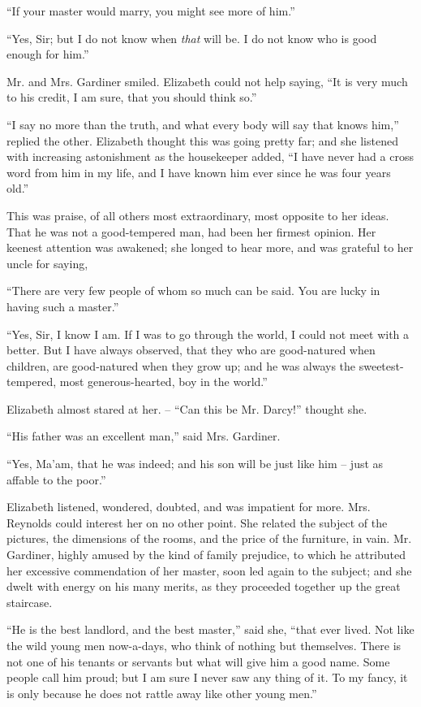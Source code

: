 “If your master would marry, you might see more of
him.”

“Yes, Sir; but I do not know when \textit{that} will be. I do
not know who is good enough for him.”

Mr. and Mrs. Gardiner smiled. Elizabeth could not
help saying, “It is very much to his credit, I am sure, that
you should think so.”

“I say no more than the truth, and what every body
will say that knows him,” replied the other. Elizabeth
thought this was going pretty far; and she listened with
increasing astonishment as the housekeeper added,
“I have never had a cross word from him in my
life, and I have known him ever since he was four years
old.”

This was praise, of all others most extraordinary, most
opposite to her ideas. That he was not a good-tempered
man, had been her firmest opinion. Her keenest attention
was awakened; she longed to hear more, and was grateful
to her uncle for saying,

“There are very few people of whom so much can be
said. You are lucky in having such a master.”

“Yes, Sir, I know I am. If I was to go through the
world, I could not meet with a better. But I have always
observed, that they who are good-natured when children,
are good-natured when they grow up; and he was always
the sweetest-tempered, most generous-hearted, boy in the
world.”

Elizabeth almost stared at her. -- “Can this be Mr.
Darcy!” thought she.

“His father was an excellent man,” said Mrs. Gardiner.

“Yes, Ma’am, that he was indeed; and his son will be
just like him -- just as affable to the poor.”

Elizabeth listened, wondered, doubted, and was impatient
for more. Mrs. Reynolds could interest her on no
other point. She related the subject of the pictures, the
dimensions of the rooms, and the price of the furniture,
in vain. Mr. Gardiner, highly amused by the kind of
family prejudice, to which he attributed her excessive
commendation of her master, soon led again to the subject;
and she dwelt with energy on his many merits, as they
proceeded together up the great staircase.

“He is the best landlord, and the best master,” said
she, “that ever lived. Not like the wild young men
now-a-days, who think of nothing but themselves. There
is not one of his tenants or servants but what will give
him a good name. Some people call him proud; but
I am sure I never saw any thing of it. To my fancy, it is
only because he does not rattle away like other young
men.”

